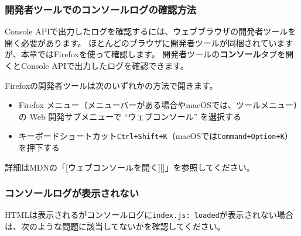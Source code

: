 \hypertarget{view-console-log-in-dev-tools}{%
\subsubsection{開発者ツールでのコンソールログの確認方法}\label{view-console-log-in-dev-tools}}

Console
APIで出力したログを確認するには、ウェブブラウザの開発者ツールを開く必要があります。
ほとんどのブラウザに開発者ツールが同梱されていますが、本章ではFirefoxを使って確認します。
開発者ツールの\textbf{コンソール}タブを開くとConsole
APIで出力したログを確認できます。

Firefoxの開発者ツールは次のいずれかの方法で開きます。

\begin{itemize}
\item
  Firefox
  メニュー（メニューバーがある場合やmacOSでは、ツールメニュー）の Web
  開発サブメニューで ``ウェブコンソール'' を選択する
\item
  キーボードショートカット\texttt{Ctrl+Shift+K}（macOSでは\texttt{Command+Option+K}）を押下する
\end{itemize}

詳細はMDNの「{[}ウェブコンソールを開く{]}{[}{]}」を参照してください。

\hypertarget{error-not-display-console-log}{%
\subsubsection{コンソールログが表示されない}\label{error-not-display-console-log}}

HTMLは表示されるがコンソールログに\texttt{index.js: loaded}が表示されない場合は、次のような問題に該当してないかを確認してください。

